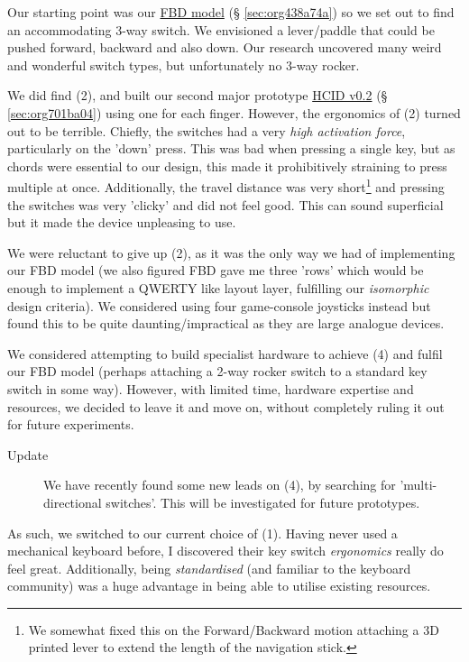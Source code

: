 \documentclass[logo,bsc,singlespacing,parskip]{infthesis}
\begin{document}
Our starting point was our \hyperref[sec:org438a74a]{FBD model} (§ \ref{sec:org438a74a}) so we set out to find an accommodating 3-way switch.
We envisioned a lever/paddle that could be pushed forward, backward and also down.
Our research uncovered many weird and wonderful switch types, but unfortunately no 3-way rocker.

We did find (2), and built our second major prototype \hyperref[sec:org701ba04]{HCID v0.2} (§ \ref{sec:org701ba04}) using one for each finger.
However, the ergonomics of (2) turned out to be terrible.
Chiefly, the switches had a very \emph{high activation force}, particularly on the 'down' press.
This was bad  when pressing a single key, but as chords were essential to our design, this made it prohibitively straining to press multiple at once.
Additionally, the travel distance was very short\footnote{We somewhat fixed this on the Forward/Backward motion attaching a 3D printed lever to extend the length of the navigation stick.} and pressing the switches was very 'clicky' and did not feel good.
This can sound superficial but it made the device unpleasing to use.

We were reluctant to give up (2), as it was the only way we had of implementing our FBD model (we also figured FBD gave me three 'rows' which would be enough to implement a QWERTY like layout layer, fulfilling our \emph{isomorphic} design criteria).
We considered using four game-console joysticks instead but found this to be quite daunting/impractical as they are large analogue devices.

We considered attempting to build specialist hardware to achieve (4) and fulfil our FBD model (perhaps attaching a 2-way rocker switch to a standard key switch in some way).
However, with limited time, hardware expertise and resources, we decided to leave it and move on, without completely ruling it out for future experiments. \\

\begin{mdframed}
\begin{description}
\item[{Update}] We have recently found some new leads on (4), by searching for 'multi-directional switches'.
This will be investigated for future prototypes.
\end{description}
\end{mdframed}


As such, we switched to our current choice of (1).
Having never used a mechanical keyboard before, I discovered their key switch \emph{ergonomics} really do feel great.
Additionally, being \emph{standardised} (and familiar to the keyboard community) was a huge advantage in being able to utilise existing resources.
\end{document}
